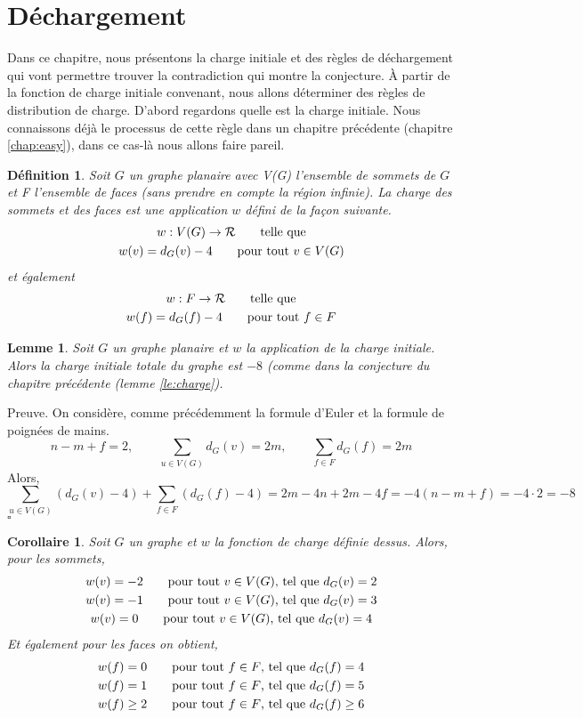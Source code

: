 \documentclass[10pt,a4paper]{article}
\newtheorem{definition}{Définition}
\newtheorem{lemme}{Lemme}
\newtheorem{corollaire}{Corollaire}
\newcommand{\ep}{{\hfill $\square$}}
\begin{document}
\section{Déchargement}
\label{chap:Dec}
Dans ce chapitre, nous présentons la charge initiale et des règles de déchargement qui vont permettre trouver la contradiction qui montre la conjecture. \` A partir de la fonction de charge initiale convenant, nous allons déterminer des règles de distribution de charge. D'abord regardons quelle est la charge initiale. Nous connaissons déjà le processus de cette règle dans un chapitre précédente (chapitre \ref{chap:easy}), dans ce cas-là nous allons faire pareil.

\begin{definition}
Soit $G$ un graphe planaire avec V(G) l'ensemble de sommets de $G$ et F l'ensemble de faces (sans prendre en compte la région infinie). La \emph{charge} des sommets et des faces est une application $w$ défini de la façon suivante.
$$
\gathered
w: V(G) \to \mathcal{R} \qquad \textrm{telle que}\\
w(v) = d_G(v) - 4 \qquad \textrm{pour tout $v \in V(G)$}\\
\endgathered
$$
et également
$$
\gathered
w: F \to \mathcal{R} \qquad \textrm{telle que}\\
w(f) = d_G(f) - 4 \qquad \textrm{pour tout $f \in F$}\\
\endgathered
$$
\end{definition}

\begin{lemme}
Soit $G$ un graphe planaire et $w$ la application de la charge initiale. Alors la charge initiale totale du graphe est $-8$ (comme dans la conjecture du chapitre précédente (lemme \ref{le:charge}).
\end{lemme}

Preuve.
On considère, comme précédemment la formule d'Euler et la formule de poignées de mains.
$$
n - m + f = 2, \qquad \sum_{u \in V(G)} d_G(v) = 2m, \qquad \sum_{f \in F} d_G(f) = 2m
$$
Alors,
$$
\sum_{u \in V(G)} (d_G(v) - 4) + \sum_{f \in F} (d_G(f) - 4) = 2m - 4n + 2m - 4f = -4( n - m + f) = -4 \cdot 2 = -8
$$
\ep

\begin{corollaire}
Soit $G$ un graphe et $w$ la fonction de charge définie dessus. Alors, pour les sommets,
$$
\gathered
w(v) = -2 \qquad \textrm{pour tout $v \in V(G)$, tel que  } d_G(v) = 2\\
w(v) = -1 \qquad \textrm{pour tout $v \in V(G)$, tel que  } d_G(v) = 3\\
w(v) = 0 \qquad \textrm{pour tout $v \in V(G)$, tel que  } d_G(v) = 4
\endgathered
$$
Et également pour les faces on obtient,
$$
\gathered
w(f) = 0 \qquad \textrm{pour tout $f \in F$, tel que  } d_G(f) = 4\\
w(f) = 1 \qquad \textrm{pour tout $f \in F$, tel que  } d_G(f) = 5\\
w(f) \geq 2 \qquad \textrm{pour tout $f \in F$, tel que  } d_G(f) \geq 6
\endgathered
$$
\end{corollaire}
\end{document}

